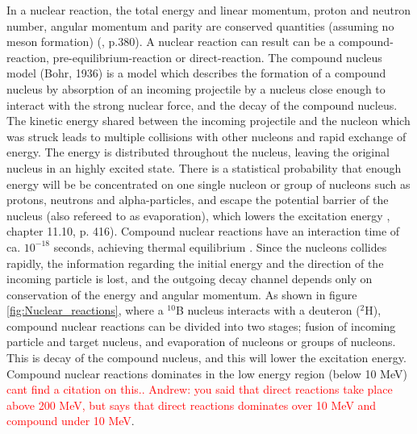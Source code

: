 In a nuclear reaction, the total energy and linear momentum, proton and neutron number, angular momentum and parity are conserved quantities (assuming no meson formation) (\cite{KraneKennethS.Halliday1987}, p.380). A nuclear reaction can result can be a compound-reaction, pre-equilibrium-reaction or direct-reaction\cite{KoningA.J.Akkermans1999}. The compound nucleus model (Bohr, 1936) \cite{Bohr1936} is a model which describes the formation of a compound nucleus by absorption of an incoming projectile by a nucleus close enough to interact with the strong nuclear force, and the decay of the compound nucleus. The kinetic energy shared between the incoming projectile and the nucleon which was struck leads to multiple collisions with other nucleons and rapid exchange of energy. The energy is distributed throughout the nucleus, leaving the original nucleus in an highly excited state. There is a statistical probability that enough energy will be be concentrated on one single nucleon or group of nucleons such as protons, neutrons and alpha-particles, and escape the potential barrier of the nucleus (also refereed to as evaporation), which lowers the excitation energy \cite{KraneKennethS.Halliday1987}, chapter 11.10, p. 416). Compound nuclear reactions have an interaction time of ca. $10^{-18}$ seconds, achieving thermal equilibrium \cite{KoningA.J.Akkermans1999}. Since the nucleons collides rapidly, the information regarding the initial energy and the direction of the incoming particle is lost, and the outgoing decay channel depends only on conservation of the energy and angular momentum. As shown in figure \ref{fig:Nuclear_reactions}, where a $^{10}$B nucleus interacts with a deuteron ($^2$H), compound nuclear reactions can be divided into two stages; fusion of incoming particle and target nucleus, and evaporation of nucleons or groups of nucleons. This is decay of the compound nucleus, and this will lower the excitation energy. Compound nuclear reactions dominates in the low energy region (below 10 MeV) \textcolor{red}{cant find a citation on this.. Andrew: you said that direct reactions take place above 200 MeV, but \cite{KoningA.J.Akkermans1999} says that direct reactions dominates over 10 MeV and compound under 10 MeV}. \\ %
